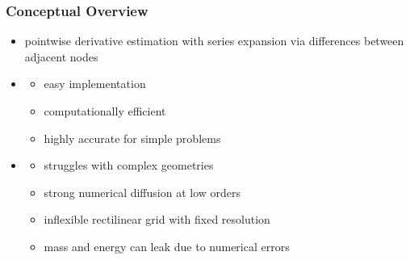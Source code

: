 	\begin{frame}
		\frametitle{Conceptual Overview}
		\begin{itemize}
			\item<2->  pointwise derivative estimation with series expansion via differences between adjacent nodes
			\item<3-> 
				\begin{itemize}
					\item<4-> easy implementation
					\item<5-> computationally efficient
					\item<6-> highly accurate for simple problems
				\end{itemize}
			\item<7->  
				\begin{itemize}
					\item<8-> struggles with complex geometries
					\item<9-> strong numerical diffusion at low orders
					\item<10-> inflexible rectilinear grid with fixed resolution
					\item<11-> mass and energy can leak due to numerical errors
				\end{itemize}
		\end{itemize}
	\end{frame}

